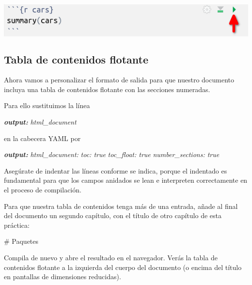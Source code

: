 \documentclass[
  title=normal,
  notoc,
  bib=normal]{mnye}
\newenvironment{Shaded}{\begin{snugshade}}{\end{snugshade}}
\newcommand{\AnnotationTok}[1]{\textcolor[rgb]{0.56,0.35,0.01}{\textbf{\textit{#1}}}}
\newcommand{\CommentTok}[1]{\textcolor[rgb]{0.56,0.35,0.01}{\textit{#1}}}
\newcommand{\FunctionTok}[1]{\textcolor[rgb]{0.00,0.00,0.00}{#1}}
\begin{document}
\begin{center}\includegraphics[width=0.8\linewidth]{images/run} \end{center}

\hypertarget{tabla-de-contenidos-flotante}{%
\subsection{Tabla de contenidos flotante}\label{tabla-de-contenidos-flotante}}

Ahora vamos a personalizar el formato de salida para que nuestro documento incluya una tabla de contenidos flotante con las secciones numeradas.

Para ello sustituimos la línea

\begin{Shaded}
\begin{Highlighting}[]
\AnnotationTok{output:}\CommentTok{ html\_document}
\end{Highlighting}
\end{Shaded}

en la cabecera YAML por

\begin{Shaded}
\begin{Highlighting}[]
\AnnotationTok{output:}\CommentTok{ }
\CommentTok{    html\_document:}
\CommentTok{        toc: true}
\CommentTok{        toc\_float: true}
\CommentTok{        number\_sections: true}
\end{Highlighting}
\end{Shaded}

Asegúrate de indentar las líneas conforme se indica, porque el indentado es fundamental para que los campos anidados se lean e interpreten correctamente en el proceso de compilación.

Para que nuestra tabla de contenidos tenga más de una entrada, añade al final del documento un segundo capítulo, con el título de otro capítulo de esta práctica:

\begin{Shaded}
\begin{Highlighting}[]
\FunctionTok{\# Paquetes}
\end{Highlighting}
\end{Shaded}

Compila de nuevo y abre el resultado en el navegador. Verás la tabla de contenidos flotante a la izquierda del cuerpo del documento (o encima del título en pantallas de dimensiones reducidas).
\end{document}
